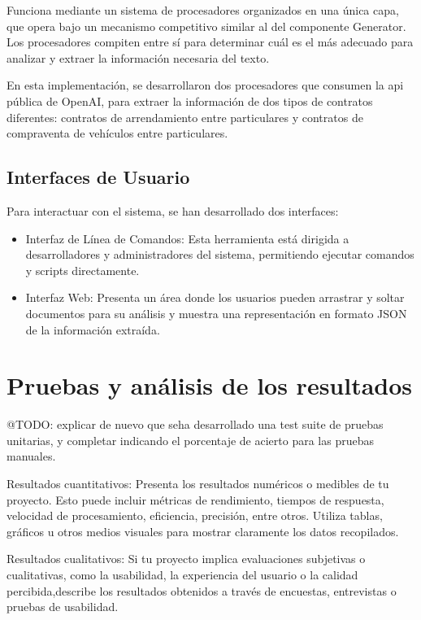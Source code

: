 Funciona mediante un sistema de procesadores organizados en una única capa, que opera bajo un mecanismo competitivo
similar al del componente Generator.
Los procesadores compiten entre sí para determinar cuál es el más adecuado para analizar y extraer la información
necesaria del texto.

En esta implementación, se desarrollaron dos procesadores que consumen la api pública de OpenAI, para extraer la
información de dos tipos de contratos diferentes: contratos de arrendamiento entre particulares y contratos de
compraventa de vehículos entre particulares.

\subsection*{Interfaces de Usuario}
Para interactuar con el sistema, se han desarrollado dos interfaces:

\begin{itemize}
    \item Interfaz de Línea de Comandos: Esta herramienta está dirigida a desarrolladores y
    administradores del sistema, permitiendo ejecutar comandos y scripts directamente.


    \item Interfaz Web: Presenta un área donde los usuarios pueden
    arrastrar y soltar documentos para su análisis y muestra una representación en formato JSON de la información
    extraída.
\end{itemize}


\section{Pruebas y análisis de los resultados}

\colorbox{color_highlight} {@TODO: }
explicar de nuevo que seha desarrollado una test suite de pruebas unitarias, y
completar indicando el porcentaje de acierto para las pruebas manuales.

Resultados cuantitativos: Presenta los resultados numéricos o medibles de tu
proyecto.
Esto puede incluir métricas de rendimiento, tiempos de respuesta, velocidad de procesamiento, eficiencia,
precisión, entre otros.
Utiliza tablas, gráficos u otros medios visuales para mostrar claramente los datos recopilados.

Resultados cualitativos: Si tu proyecto implica evaluaciones subjetivas o cualitativas, como la usabilidad, la
experiencia del usuario o la calidad percibida,describe los resultados obtenidos a través de encuestas, entrevistas o
pruebas de usabilidad.

